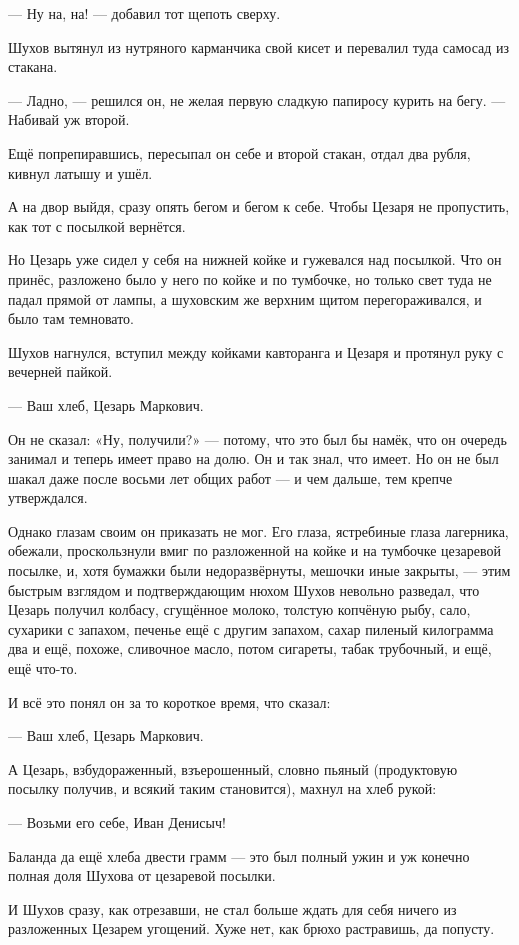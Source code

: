 --- Ну на, на! --- добавил тот щепоть сверху.

Шухов вытянул из нутряного карманчика свой кисет и перевалил туда самосад из стакана.

--- Ладно, --- решился он, не желая первую сладкую папиросу курить на бегу. --- Набивай уж второй.

Ещё попрепиравшись, пересыпал он себе и второй стакан, отдал два рубля, кивнул латышу и ушёл.

А на двор выйдя, сразу опять бегом и бегом к себе. Чтобы Цезаря не пропустить, как тот с
посылкой вернётся.

Но Цезарь уже сидел у себя на нижней койке и гужевался над посылкой. Что он принёс, разложено
было у него по койке и по тумбочке, но только свет туда не падал прямой от лампы, а шуховским
же верхним щитом перегораживался, и было там темновато.

Шухов нагнулся, вступил между койками кавторанга и Цезаря и протянул руку с вечерней пайкой.

--- Ваш хлеб, Цезарь Маркович.

Он не сказал: «Ну, получили?» --- потому, что это был бы намёк, что он очередь занимал и теперь
имеет право на долю. Он и так знал, что имеет. Но он не был шакал даже после восьми лет общих
работ --- и чем дальше, тем крепче утверждался.

Однако глазам своим он приказать не мог. Его глаза, ястребиные глаза лагерника, обежали,
проскользнули вмиг по разложенной на койке и на тумбочке цезаревой посылке, и, хотя бумажки
были недоразвёрнуты, мешочки иные закрыты, --- этим быстрым взглядом и подтверждающим нюхом
Шухов невольно разведал, что Цезарь получил колбасу, сгущённое молоко, толстую копчёную
рыбу, сало, сухарики с запахом, печенье ещё с другим запахом, сахар пиленый килограмма два и
ещё, похоже, сливочное масло, потом сигареты, табак трубочный, и ещё, ещё что-то.

И всё это понял он за то короткое время, что сказал:

--- Ваш хлеб, Цезарь Маркович.

А Цезарь, взбудораженный, взъерошенный, словно пьяный (продуктовую посылку получив, и всякий
таким становится), махнул на хлеб рукой:

--- Возьми его себе, Иван Денисыч!

Баланда да ещё хлеба двести грамм --- это был полный ужин и уж конечно полная доля Шухова от
цезаревой посылки.

И Шухов сразу, как отрезавши, не стал больше ждать для себя ничего из разложенных Цезарем
угощений. Хуже нет, как брюхо растравишь, да попусту.


